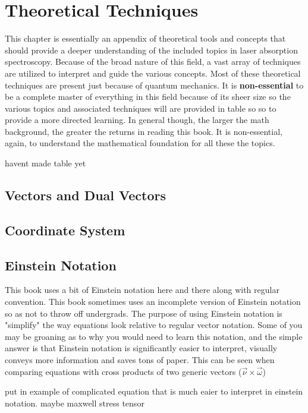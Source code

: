 \documentclass[11pt,a4paper]{book}
\begin{document}
\chapter{Theoretical Techniques}
	This chapter is essentially an appendix of theoretical tools and concepts that should provide a deeper understanding of the included topics in laser absorption spectroscopy. Because of the broad nature of this field, a vast array of techniques are utilized to interpret and guide the various concepts. Most of these theoretical techniques are present just because of quantum mechanics. It is \textbf{non-essential} to be a complete master of everything in this field because of its sheer size so the various topics and associated techniques will are provided in table so so to provide a more directed learning. In general though, the larger the math background, the greater the returns in reading this book. It is non-essential, again, to understand the mathematical foundation for all these the topics. 
	
	havent made table yet
	\section{Vectors and Dual Vectors}
		\label{sec:Vectors and Dual Vectors}
	\section{Coordinate System}
		\label{coordinate System}
		
	\section{Einstein Notation}
		\label{sec:Einstein Notation}
		This book uses a bit of Einstein notation here and there along with regular convention. This book sometimes uses an incomplete version of Einstein notation so as not to throw off undergrads. The purpose of using Einstein notation is "simplify" the way equations look relative to regular vector notation. Some of you may be groaning as to why you would need to learn this notation, and the simple answer is that Einstein notation is significantly easier to interpret, visually conveys more information and saves tons of paper. This can be seen when comparing equations with cross products of two generic vectors ($\vec{\nu} \times \vec{\omega}$)
		
		put in example of complicated equation that is much eaier to interpret in einstein notation. maybe maxwell stress tensor	
		
\end{document}

